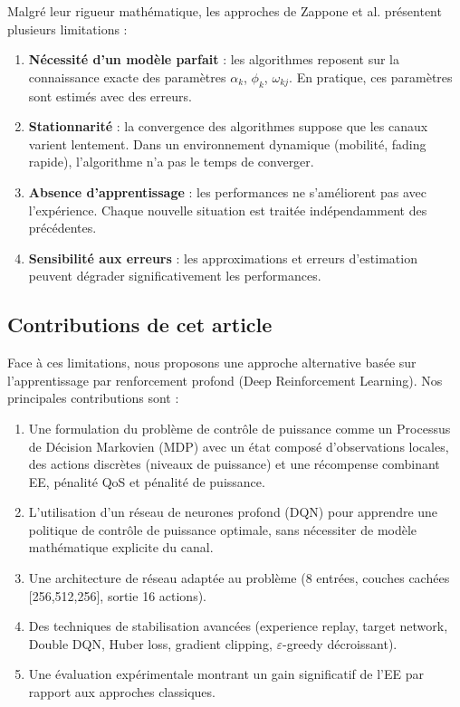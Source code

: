 \documentclass[conference]{IEEEtran}
\begin{document}
Malgré leur rigueur mathématique, les approches de Zappone et al. présentent plusieurs limitations :

\begin{enumerate}
    \item \textbf{Nécessité d'un modèle parfait} : les algorithmes reposent sur la connaissance exacte des paramètres $\alpha_k$, $\phi_k$, $\omega_{kj}$. En pratique, ces paramètres sont estimés avec des erreurs.
    \item \textbf{Stationnarité} : la convergence des algorithmes suppose que les canaux varient lentement. Dans un environnement dynamique (mobilité, fading rapide), l'algorithme n'a pas le temps de converger.
    \item \textbf{Absence d'apprentissage} : les performances ne s'améliorent pas avec l'expérience. Chaque nouvelle situation est traitée indépendamment des précédentes.
    \item \textbf{Sensibilité aux erreurs} : les approximations et erreurs d'estimation peuvent dégrader significativement les performances.
\end{enumerate}

\subsection{Contributions de cet article}

Face à ces limitations, nous proposons une approche alternative basée sur l'apprentissage par renforcement profond (Deep Reinforcement Learning). Nos principales contributions sont :

\begin{enumerate}
    \item Une formulation du problème de contrôle de puissance comme un Processus de Décision Markovien (MDP) avec un état composé d'observations locales, des actions discrètes (niveaux de puissance) et une récompense combinant EE, pénalité QoS et pénalité de puissance.
    \item L'utilisation d'un réseau de neurones profond (DQN) pour apprendre une politique de contrôle de puissance optimale, sans nécessiter de modèle mathématique explicite du canal.
    \item Une architecture de réseau adaptée au problème (8 entrées, couches cachées [256,512,256], sortie 16 actions).
    \item Des techniques de stabilisation avancées (experience replay, target network, Double DQN, Huber loss, gradient clipping, $\varepsilon$-greedy décroissant).
    \item Une évaluation expérimentale montrant un gain significatif de l'EE par rapport aux approches classiques.
\end{enumerate}
\end{document}

